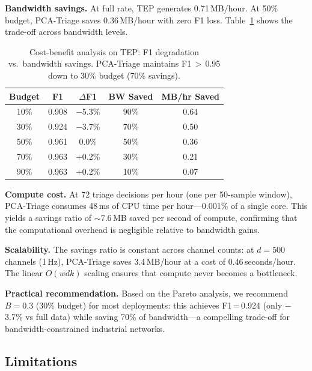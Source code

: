 \documentclass[journal]{IEEEtran}
\begin{document}
\textbf{Bandwidth savings.} At full rate, TEP generates 0.71\,MB/hour. At 50\% budget, PCA-Triage saves 0.36\,MB/hour with zero F1 loss. Table~\ref{tab:costbenefit} shows the trade-off across bandwidth levels.

\begin{table}[t]
\centering
\caption{Cost-benefit analysis on TEP: F1 degradation vs.\ bandwidth savings. PCA-Triage maintains F1\,$>$\,0.95 down to 30\% budget (70\% savings).}
\begin{tabular}{@{}ccccc@{}}
\toprule
\textbf{Budget} & \textbf{F1} & \textbf{$\Delta$F1} & \textbf{BW Saved} & \textbf{MB/hr Saved} \\
\midrule
10\% & 0.908 & $-$5.3\% & 90\% & 0.64 \\
30\% & 0.924 & $-$3.7\% & 70\% & 0.50 \\
50\% & 0.961 & 0.0\% & 50\% & 0.36 \\
70\% & 0.963 & $+$0.2\% & 30\% & 0.21 \\
90\% & 0.963 & $+$0.2\% & 10\% & 0.07 \\
\bottomrule
\end{tabular}
\label{tab:costbenefit}
\end{table}

\textbf{Compute cost.} At 72 triage decisions per hour (one per 50-sample window), PCA-Triage consumes 48\,ms of CPU time per hour---0.001\% of a single core. This yields a savings ratio of ${\sim}7.6$\,MB saved per second of compute, confirming that the computational overhead is negligible relative to bandwidth gains.

\textbf{Scalability.} The savings ratio is constant across channel counts: at $d{=}500$ channels (1\,Hz), PCA-Triage saves 3.4\,MB/hour at a cost of 0.46\,seconds/hour. The linear $O(wdk)$ scaling ensures that compute never becomes a bottleneck.

\textbf{Practical recommendation.} Based on the Pareto analysis, we recommend $B{=}0.3$ (30\% budget) for most deployments: this achieves F1\,=\,0.924 (only $-$3.7\% vs full data) while saving 70\% of bandwidth---a compelling trade-off for bandwidth-constrained industrial networks.

\subsection{Limitations}
\end{document}

